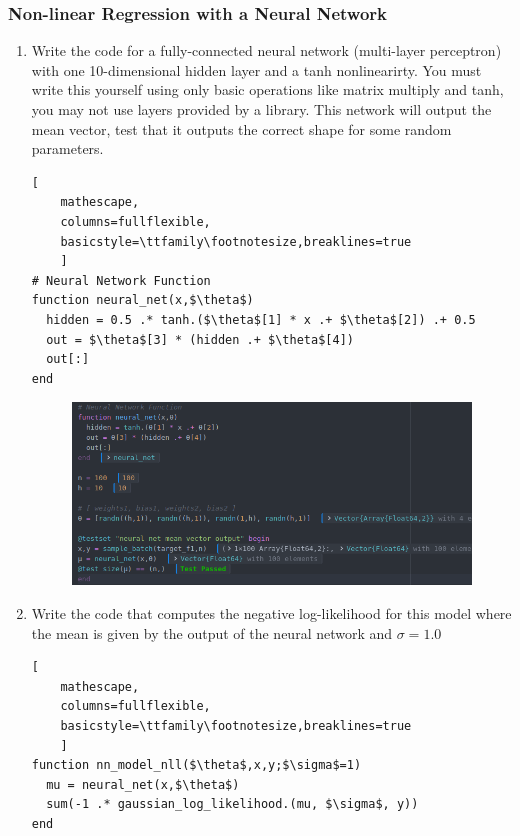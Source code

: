 \documentclass[12pt,letter]{article}
\begin{document}
\subsubsection{Non-linear Regression with a Neural Network}
\begin{enumerate}
\item Write the code for a fully-connected neural network (multi-layer perceptron) with one 10-dimensional hidden layer and a tanh nonlinearirty. You must write this yourself using only basic operations like matrix multiply and tanh, you may not use layers provided by a library. This network will output the mean vector, test that it outputs the correct shape for some random parameters.
\begin{lstlisting}[
    mathescape,
    columns=fullflexible,
    basicstyle=\ttfamily\footnotesize,breaklines=true
    ]
# Neural Network Function
function neural_net(x,$\theta$)
  hidden = 0.5 .* tanh.($\theta$[1] * x .+ $\theta$[2]) .+ 0.5
  out = $\theta$[3] * (hidden .+ $\theta$[4])
  out[:]
end
\end{lstlisting}
\begin{figure}[h]
  \centering
  \includegraphics[width=15cm,keepaspectratio]{imgs/test4.png}
\end{figure}

\pagebreak

\item Write the code that computes the negative log-likelihood for this model where the mean is given by the output of the neural network and $\sigma = 1.0$

\begin{lstlisting}[
    mathescape,
    columns=fullflexible,
    basicstyle=\ttfamily\footnotesize,breaklines=true
    ]
function nn_model_nll($\theta$,x,y;$\sigma$=1)
  mu = neural_net(x,$\theta$)
  sum(-1 .* gaussian_log_likelihood.(mu, $\sigma$, y))
end
\end{lstlisting}


\end{enumerate}
\end{document}
